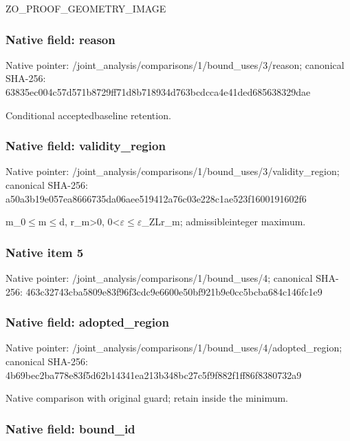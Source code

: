 \documentclass[10pt,a4paper]{article}
\begin{document}
ZO\_PROOF\_GEOMETRY\_IMAGE


\subsubsection{Native field: reason}


Native pointer: /joint\_analysis/comparis\allowbreak{}ons/1/bound\_uses/3/reaso\allowbreak{}n; canonical SHA-256: 63835ec004c57d571b8729ff\allowbreak{}71d8b718934d763bcdcca4e4\allowbreak{}1ded685638329dae


Conditional acceptedbaseline retention.


\subsubsection{Native field: validity\_region}


Native pointer: /joint\_analysis/comparis\allowbreak{}ons/1/bound\_uses/3/valid\allowbreak{}ity\_region; canonical SHA-256: a50a3b19e057ea8666735da0\allowbreak{}6aee519412a76c03e228c1ae\allowbreak{}523f1600191602f6


m\_0\ensuremath{\le}m\ensuremath{\le}d, r\_m>0, 0<\ensuremath{\varepsilon}\ensuremath{\le}\ensuremath{\varepsilon}\_ZLr\_m; admissibleinteger maximum.


\subsubsection{Native item 5}


Native pointer: /joint\_analysis/comparis\allowbreak{}ons/1/bound\_uses/4; canonical SHA-256: 463c32743cba5809e83f96f3\allowbreak{}cdc9e6600e50bf921b9e0cc5\allowbreak{}bcba684c146fc1e9



\subsubsection{Native field: adopted\_region}


Native pointer: /joint\_analysis/comparis\allowbreak{}ons/1/bound\_uses/4/adopt\allowbreak{}ed\_region; canonical SHA-256: 4b69bec2ba778e83f5d62b14\allowbreak{}341ea213b348bc27c5f9f882\allowbreak{}f1ff86f8380732a9


Native comparison with original guard; retain inside the minimum.


\subsubsection{Native field: bound\_id}
\end{document}
